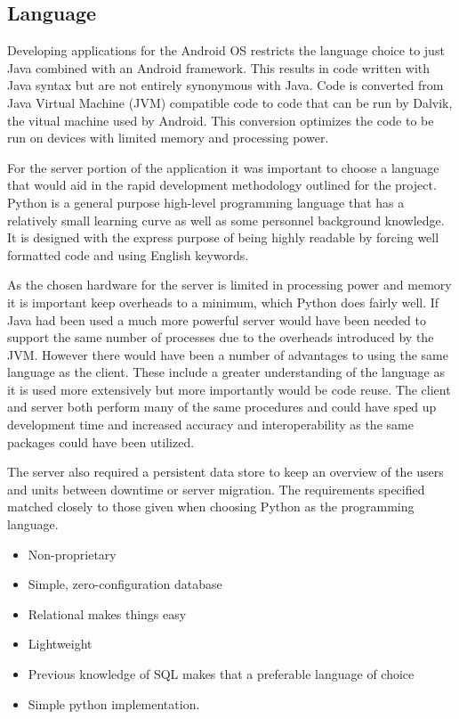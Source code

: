 \subsection{Language}
Developing applications for the Android OS restricts the language choice to just Java combined with an Android framework. This results in code written with Java syntax but are not entirely synonymous with Java. Code is converted from Java Virtual Machine (JVM) compatible code to code that can be run by Dalvik, the vitual machine used by Android. This conversion optimizes the code to be run on devices with limited memory and processing power.

For the server portion of the application it was important to choose a language that would aid in the rapid development methodology outlined for the project. Python is a general purpose high-level programming language that has a relatively small learning curve as well as some personnel background knowledge. It is designed with the express purpose of being highly readable by forcing well formatted code and using English keywords. 

As the chosen hardware for the server is limited in processing power and memory it is important keep overheads to a minimum, which Python does fairly well. If Java had been used a much more powerful server would have been needed to support the same number of processes due to the overheads introduced by the JVM. However there would have been a number of advantages to using the same language as the client. These include a greater understanding of the language as it is used more extensively but more importantly would be code reuse. The client and server both perform many of the same procedures and could have sped up development time and increased accuracy and interoperability as the same packages could have been utilized.

The server also required a persistent data store to keep an overview of the users and units between downtime or server migration. The requirements specified matched closely to those given when choosing Python as the programming language. 

\begin{itemize}
\item Non-proprietary
\item Simple, zero-configuration database
\item Relational makes things easy
\item Lightweight
\item Previous knowledge of SQL makes that a preferable language of choice
\item Simple python implementation.
\end{itemize}


